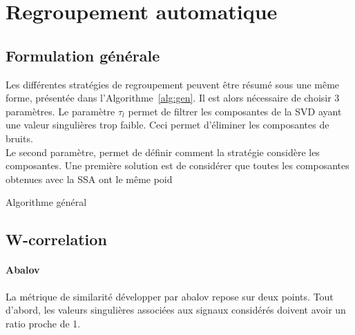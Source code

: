 \documentclass{gretsi}
\makeatletter
\def\BState{\State\hskip-\ALG@thistlm}
\makeatother
\begin{document}
\section{Regroupement automatique}

\subsection{Formulation générale}
\label{sub:form}

Les différentes stratégies de regroupement peuvent être résumé sous une même forme, présentée dans \mbox{l'Algorithme \ref{alg:gen}}. Il est alors nécessaire de choisir 3 paramètres. Le paramètre $\tau_l$ permet de filtrer les composantes de la SVD ayant une valeur singulières trop faible. Ceci permet d'éliminer les composantes de bruits.\\

Le second paramètre,  permet de définir comment la stratégie considère les composantes. Une première solution est de considérer que toutes les composantes obtenues avec la SSA ont le même poid

\begin{algorithm}
\caption{Algorithme général}\label{alg:gen}
\end{algorithm}

\subsection{W-correlation}

\paragraph{Abalov}
\label{par:}
La métrique de similarité développer par abalov repose sur deux points. Tout d'abord, les valeurs singulières associées aux signaux considérés doivent avoir un ratio proche de 1.

\end{document}
